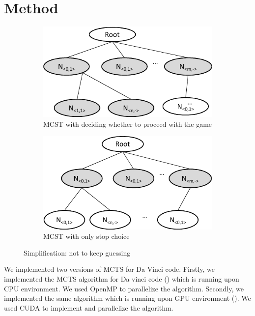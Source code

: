 
\section{Method}

\begin{figure}
\begin{subfigure}[b]{0.95\columnwidth}
\includegraphics [width=0.95\columnwidth]{figures/sub_guess_1.pdf}
\caption{MCST with deciding whether to proceed with the game }
\label{fig:proceed_game}
\end{subfigure}
\par\bigskip
\begin{subfigure}[b]{0.95\columnwidth}
\includegraphics [width=0.95\columnwidth]{figures/sub_guess_2.pdf}
\caption{MCST with only stop choice}
\label{fig:stop_game}
\end{subfigure}
\caption{Simplification: not to keep guessing}
\end{figure}


We implemented two versions of MCTS for Da Vinci code. 
Firstly, we implemented the MCTS algorithm for Da vinci code (\cpu) which is running upon CPU environment.
We used OpenMP to parallelize the algorithm.
Secondly, we implemented the same algorithm which is running upon GPU environment (\gpu).
We used CUDA to implement and parallelize the algorithm.

